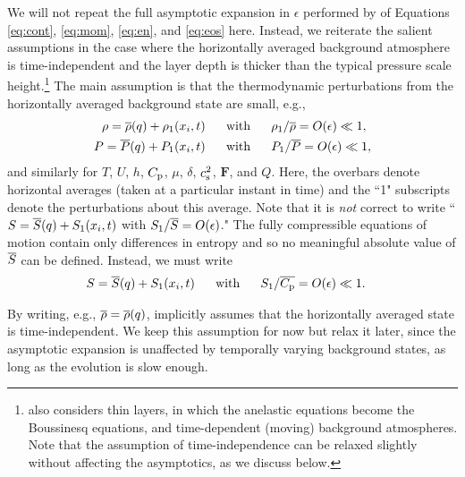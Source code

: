 \documentclass[12pt]{article}
\newcommand{\vecf}{\bm{F}}
\begin{document}
	
	We will not repeat the full asymptotic expansion in $\epsilon$ performed by \citet{Gough1969} of Equations \eqref{eq:cont}, \eqref{eq:mom}, \eqref{eq:en}, and \eqref{eq:eos} here. Instead, we reiterate the salient assumptions in the case where the horizontally averaged background atmosphere is time-independent and the layer depth is thicker than the typical pressure scale height.\footnote{\citet{Gough1969} also considers thin layers, in which the anelastic equations become the Boussinesq equations, and time-dependent (moving) background atmospheres. Note that the assumption of time-independence can be relaxed slightly without affecting the asymptotics, as we discuss below.} The main assumption is that the thermodynamic perturbations from the horizontally averaged background state are small, e.g.,
	\begin{align}\label{eq:linearthermo}
		\rho = \overline{\rho}(q) + \rho_1(x_i,t)\ \ \ \ \  &\text{with}\ \ \ \ \  \rho_1/\overline{\rho}=O(\epsilon)\ll 1,\\
		P = \overline{P}(q) + P_1(x_i,t)\ \ \ \ \  &\text{with}\ \ \ \ \  P_1/\overline{P}=O(\epsilon)\ll1 \nonumber,
	\end{align} 
	and similarly for $T$, $U$, $h$, $C_{\rm{p}}$, $\mu$, $\delta$, $c_{\rm s}^2$, $\vecf$, and $Q$. Here, the overbars denote horizontal averages (taken at a particular instant in time) and the ``1" subscripts denote the perturbations about this average. Note that it is \textit{not} correct to write ``$S=\overline{S}(q)+S_1(x_i,t)$ with $S_1/\overline{S}=O(\epsilon)$." The fully compressible equations of motion contain only differences in entropy and so no meaningful absolute value of $\overline{S}$ can be defined. Instead, we must write
	\begin{align}\label{eq:linearent}
	S = \overline{S}(q) + S_1(x_i,t) \ \ \ \ \  &\text{with}\ \ \ \ \  S_1/\overline{C_{\rm{p}}}=O(\epsilon)\ll 1.
	\end{align}
	
	By writing, e.g., $\overline{\rho}=\overline{\rho}(q)$, \citet{Gough1969} implicitly assumes that the horizontally averaged state is time-independent. We keep this assumption for now but relax it later, since the asymptotic expansion is unaffected by temporally varying background states, as long as the evolution is slow enough. 
	
\end{document}
